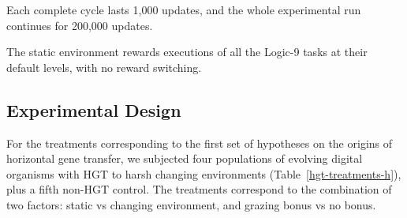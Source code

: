 \documentclass[PhD]{msu-thesis}
\begin{document}

Each complete cycle lasts 1,000 updates, and the whole experimental run continues for 200,000 updates.

The static environment rewards executions of all the Logic-9 tasks at their default levels, with no reward switching.


\subsection{Experimental Design}
For the treatments corresponding to the first set of hypotheses on the origins of horizontal gene transfer, we subjected four populations of evolving digital organisms with HGT to harsh changing environments (Table~\ref{hgt-treatments-h}), plus a fifth non-HGT control. The treatments correspond to the combination of two factors: static vs changing environment, and grazing bonus vs no bonus.


\end{document}
